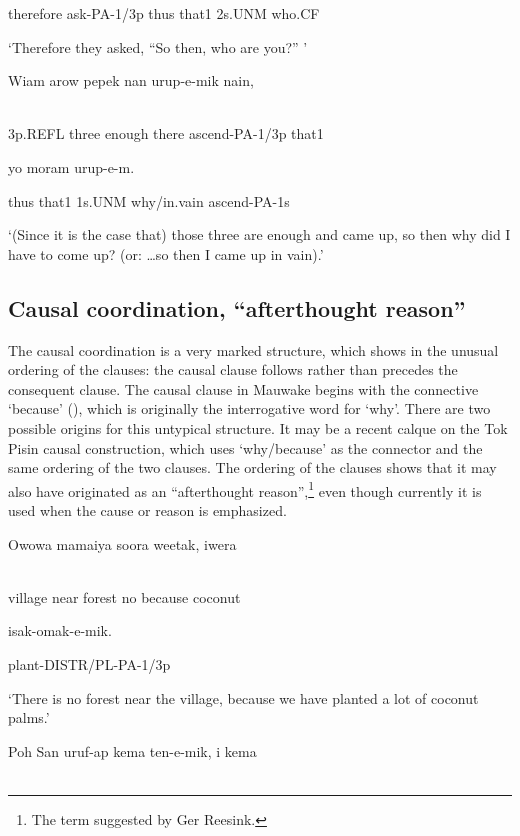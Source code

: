 therefore  ask-PA-1/3p  thus  that1  2s.UNM  who.CF

`Therefore they asked, ``So then, who are you?'' '

\ea%
\label{ex:x1424}
\gll Wiam  arow  pepek  nan  urup-e-mik  nain,  \\
      \\
\glt
\z

3p.REFL  three  enough  there  ascend-PA-1/3p  that1

  yo  moram  urup-e-m.

thus  that1  1s.UNM  why/in.vain  ascend-PA-1s

`(Since it is the case that) those three are enough and came up, so then why did I have to come up? (or: {\dots}so then I came up in vain).'

\subsection{Causal coordination, ``afterthought reason''}
\hypertarget{RefHeading23061935131865}{}
The causal coordination is a very marked structure, which shows in the unusual ordering of the clauses: the causal clause follows rather than precedes the consequent clause. The causal clause in Mauwake begins with the connective  `because' (), which is originally the interrogative word for `why'.  There are two possible origins for this untypical structure. It may be a recent calque on the Tok Pisin causal construction, which uses  `why/because' as the connector and the same ordering of the two clauses. The ordering of the clauses shows that it may also have originated as an ``afterthought reason'',\footnote{The term suggested by Ger Reesink.} even though  currently it is used when the cause or reason is emphasized. 

\ea%
\label{ex:x1417}
\gll Owowa  mamaiya  soora  weetak,    iwera \\
      \\
\glt
\z

village  near  forest  no  because  coconut

isak-omak-e-mik.

plant-DISTR/PL-PA-1/3p

`There is no forest near the village, because we have planted a lot of coconut palms.'

\ea%
\label{ex:x1420}
\gll Poh  San  uruf-ap  kema  ten-e-mik,    i  kema \\
      \\
\glt
\z


